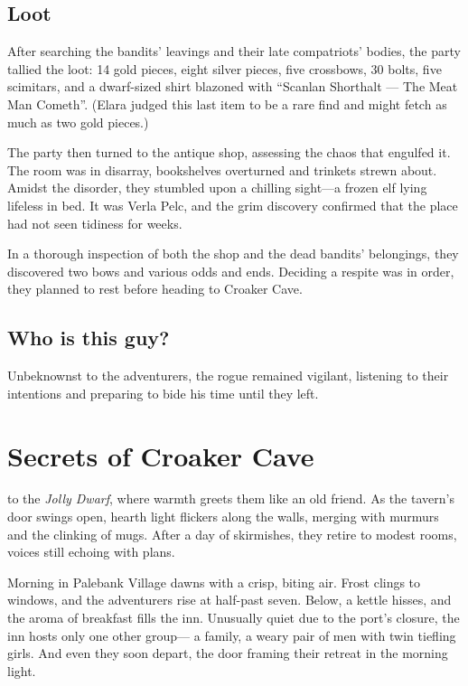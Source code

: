 \documentclass[
  letterpaper,12pt,twoside,twocolumn,openany,
  nodeprecatedcode,bg=full]{dndbook}
\begin{document}
\section{Loot}\label{loot}

After searching the bandits' leavings and their late compatriots'
bodies, the party tallied the loot: 14 gold pieces, eight silver pieces,
five crossbows, 30 bolts, five scimitars, and a dwarf-sized shirt
blazoned with ``Scanlan Shorthalt --- The Meat Man Cometh''. (Elara
judged this last item to be a rare find and might fetch as much as two
gold pieces.)

The party then turned to the antique shop, assessing the chaos that
engulfed it. The room was in disarray, bookshelves overturned and
trinkets strewn about. Amidst the disorder, they stumbled upon a
chilling sight---a frozen elf lying lifeless in bed. It was Verla Pelc,
and the grim discovery confirmed that the place had not seen tidiness
for weeks.

In a thorough inspection of both the shop and the dead bandits'
belongings, they discovered two bows and various odds and ends. Deciding
a respite was in order, they planned to rest before heading to Croaker
Cave.

\section{Who is this guy?}\label{who-is-this-guy}

Unbeknownst to the adventurers, the rogue remained vigilant, listening
to their intentions and preparing to bide his time until they left.

\chapter{Secrets of Croaker Cave}\label{secrets-of-croaker-cave}

 to the \emph{Jolly
Dwarf}, where warmth greets them like an old friend. As the tavern's
door swings open, hearth light flickers along the walls, merging with
murmurs and the clinking of mugs. After a day of skirmishes, they retire
to modest rooms, voices still echoing with plans.

Morning in Palebank Village dawns with a crisp, biting air. Frost clings
to windows, and the adventurers rise at half-past seven. Below, a kettle
hisses, and the aroma of breakfast fills the inn. Unusually quiet due to
the port's closure, the inn hosts only one other group--- a family, a
weary pair of men with twin tiefling girls. And even they soon depart,
the door framing their retreat in the morning light.
\end{document}
